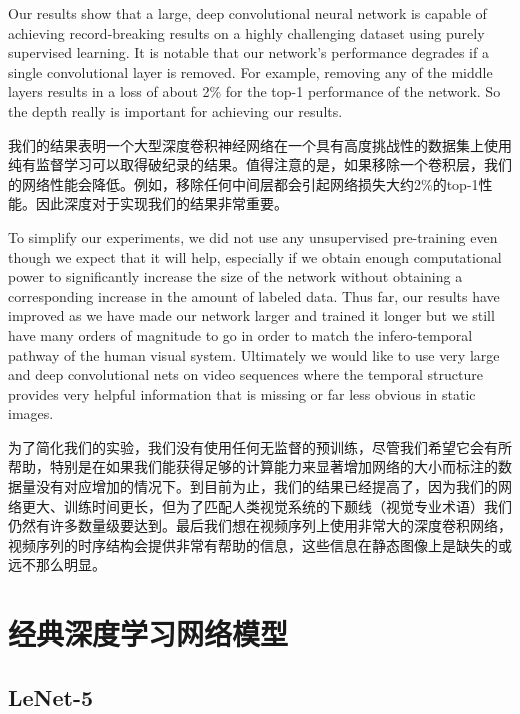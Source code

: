 \documentclass[12pt,a4paper,UTF8,twoside]{book}
\begin{document}
Our results show that a large, deep convolutional neural network is capable of achieving record-breaking results on a highly challenging dataset using purely supervised learning. It is notable that our network's performance degrades if a single convolutional layer is removed. For example, removing any of the middle layers results in a loss of about 2\% for the top-1 performance of the network. So the depth really is important for achieving our results.

我们的结果表明一个大型深度卷积神经网络在一个具有高度挑战性的数据集上使用纯有监督学习可以取得破纪录的结果。值得注意的是，如果移除一个卷积层，我们的网络性能会降低。例如，移除任何中间层都会引起网络损失大约2\%的top-1性能。因此深度对于实现我们的结果非常重要。

To simplify our experiments, we did not use any unsupervised pre-training even though we expect that it will help, especially if we obtain enough computational power to significantly increase the size of the network without obtaining a corresponding increase in the amount of labeled data. Thus far, our results have improved as we have made our network larger and trained it longer but we still have many orders of magnitude to go in order to match the infero-temporal pathway of the human visual system. Ultimately we would like to use very large and deep convolutional nets on video sequences where the temporal structure provides very helpful information that is missing or far less obvious in static images.

为了简化我们的实验，我们没有使用任何无监督的预训练，尽管我们希望它会有所帮助，特别是在如果我们能获得足够的计算能力来显著增加网络的大小而标注的数据量没有对应增加的情况下。到目前为止，我们的结果已经提高了，因为我们的网络更大、训练时间更长，但为了匹配人类视觉系统的下颞线（视觉专业术语）我们仍然有许多数量级要达到。最后我们想在视频序列上使用非常大的深度卷积网络，视频序列的时序结构会提供非常有帮助的信息，这些信息在静态图像上是缺失的或远不那么明显。

\hypertarget{ux7ecfux5178ux6df1ux5ea6ux5b66ux4e60ux7f51ux7edcux6a21ux578b}{%
\chapter{经典深度学习网络模型}\label{ux7ecfux5178ux6df1ux5ea6ux5b66ux4e60ux7f51ux7edcux6a21ux578b}}

\hypertarget{lenet-5}{%
\section{LeNet-5}\label{lenet-5}}
\end{document}
